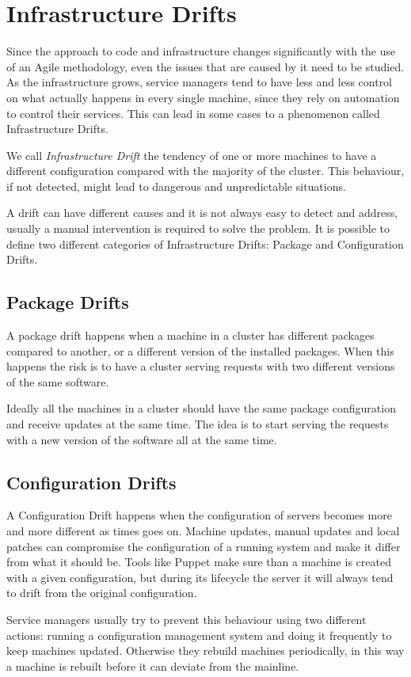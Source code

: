\section{Infrastructure Drifts}

Since the approach to code and infrastructure changes significantly with the
use of an Agile methodology, even the issues that are caused by it need to be
studied. As the infrastructure grows, service managers tend to have less and
less control on what actually happens in every single machine, since they rely
on automation to control their services. This can lead in some cases to
a phenomenon called Infrastructure Drifts.

We call \textit{Infrastructure Drift} the tendency of one or more machines
to have a different configuration compared with the majority of the
cluster. This behaviour, if not detected, might lead to dangerous and
unpredictable situations.

A drift can have different causes and it is not always easy to detect and
address, usually a manual intervention is required to solve the problem.
It is possible to define two different categories of Infrastructure
Drifts: Package and Configuration Drifts.

\subsection{Package Drifts}

A package drift happens when a machine in a cluster has different packages
compared to another, or a different version of the installed packages.
When this happens the risk is to have a cluster serving requests with two
different versions of the same software.

Ideally all the machines in a cluster should have the same package
configuration and receive updates at the same time. The idea is to start
serving the requests with a new version of the software all at the same
time. 

\subsection{Configuration Drifts}

A Configuration Drift happens when the configuration of servers becomes
more and more different as times goes on. Machine updates, manual updates
and local patches can compromise the configuration of a running system and
make it differ from what it should be. Tools like Puppet make sure than
a machine is created with a given configuration, but during its lifecycle
the server it will always tend to drift from the original configuration.

Service managers usually try to prevent this behaviour using two different
actions: running a configuration management system and doing it frequently
to keep machines updated. Otherwise they rebuild machines periodically, in
this way a machine is rebuilt before it can deviate from the mainline.
